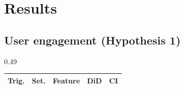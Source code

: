\section{Results}
\subsection{User engagement (Hypothesis 1)}
\begin{table}[t!]
\centering
\captionsetup[subtable]{justification=centering}
\setlength{\tabcolsep}{4pt}        %
\renewcommand{\arraystretch}{1.1}  %

\begin{subtable}[t]{0.49\textwidth}
\centering\small
\begin{tabular}{cc|ccc}
\textbf{Trig.} & \textbf{Set.} & \textbf{Feature} & \textbf{DiD} & \textbf{CI} \\ \hline


\end{tabular}
\end{subtable}
\end{table}
